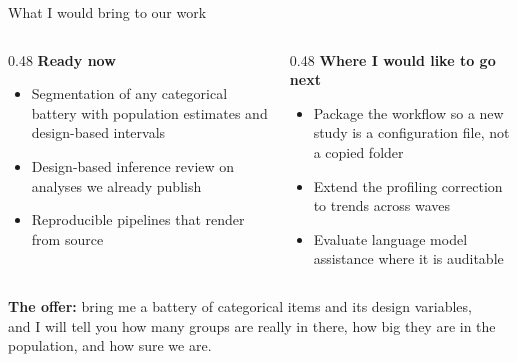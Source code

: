 \documentclass[
  ignorenonframetext,
  aspectratio=169,
]{beamer}
\newcommand{\kicker}[1]{\par\noindent{\footnotesize\color{vteal}\textbf{\MakeUppercase{#1}}}\par\vspace{0.4em}}
\begin{document}
\begin{frame}[shrink]{What I would bring to our work}
\label{what-i-would-bring-to-our-work}
\kicker{next steps}

\small

\begin{columns}[T]
\begin{column}{0.48\textwidth}
\textbf{Ready now}
\begin{itemize}\itemsep3pt
  \item Segmentation of any categorical battery with population estimates and design-based intervals
  \item Design-based inference review on analyses we already publish
  \item Reproducible pipelines that render from source
\end{itemize}
\end{column}
\begin{column}{0.48\textwidth}
\textbf{Where I would like to go next}
\begin{itemize}\itemsep3pt
  \item Package the workflow so a new study is a configuration file, not a copied folder
  \item Extend the profiling correction to trends across waves
  \item Evaluate language model assistance where it is auditable
\end{itemize}
\end{column}
\end{columns}

\vspace{0.8em}

\begin{center}
\colorbox{vteal!15}{\parbox{0.92\textwidth}{\centering
\textbf{The offer:} bring me a battery of categorical items and its design variables, \\ and I will tell you how many groups are really in there, how big they are in the population, and how sure we are.}}
\end{center}

\end{frame}
\end{document}
